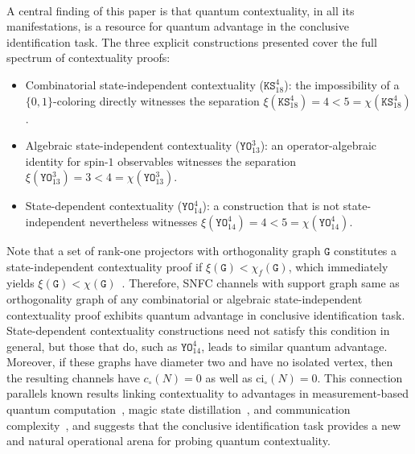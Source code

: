 \documentclass[12pt,a4paper]{article}
\begin{document}
\vspace{-.35cm}\\ 

\noindent A central finding of this paper is that quantum contextuality, in all its manifestations, is a resource for quantum advantage in the conclusive identification task. The three explicit constructions presented cover the full spectrum of contextuality proofs:
\begin{itemize}[itemsep=-0.15cm, parsep=0.15cm, topsep=2pt, leftmargin=1.0cm]
\item[$\checkmark$] Combinatorial state-independent contextuality ($\mathtt{KS}^4_{18}$): the impossibility of a $\{0,1\}$-coloring directly witnesses the separation $\xi(\mathtt{KS}^4_{18}) = 4 < 5 =\chi(\mathtt{KS}^4_{18})$.
\item[$\checkmark$] Algebraic state-independent contextuality ($\mathtt{YO}^3_{13}$): an operator-algebraic identity for spin-$1$ observables witnesses the separation $\xi(\mathtt{YO}^3_{13}) = 3 < 4 = \chi(\mathtt{YO}^3_{13})$.
\item[$\checkmark$] State-dependent contextuality    ($\mathtt{YO}^4_{14}$): a construction that is not state-independent nevertheless witnesses $\xi(\mathtt{YO}^4_{14}) = 4 < 5 = \chi(\mathtt{YO}^4_{14})$.
\end{itemize}
Note that a set of rank-one projectors with orthogonality graph $\mathtt{G}$ constitutes a state-independent contextuality proof if $\xi(\mathtt{G})<\chi_f(\mathtt{G})$, which immediately yields $\xi(\mathtt{G}) < \chi(\mathtt{G})$~\cite{Cabello2015}. Therefore, SNFC channels with support graph same as orthogonality graph of any combinatorial or algebraic state-independent contextuality proof exhibits quantum advantage in conclusive identification task. State-dependent contextuality constructions need not satisfy this condition in general, but those that do, such as $\mathtt{YO}^4_{14}$, leads to similar quantum advantage. Moreover, if these graphs have diameter two and have no isolated vertex, then the resulting channels have $c_\circ(N) = 0$ as well as $\mathrm{ci}_\circ(N) = 0$. This connection parallels known results linking contextuality to advantages in measurement-based quantum computation~\cite{Raussendorf2013}, magic state distillation~\cite{Howard2014}, and communication complexity~\cite{Gupta2023,Chowdhury2026}, and suggests that the conclusive identification task provides a new and natural operational arena for probing quantum contextuality.\\
\end{document}
